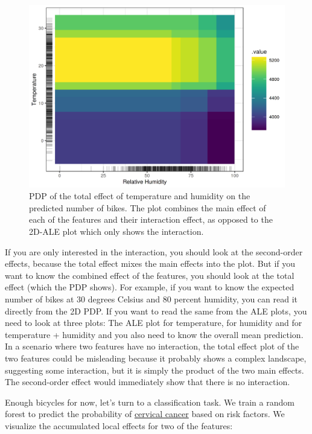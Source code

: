 \documentclass[12pt,]{krantz}
\begin{document}
\begin{figure}

{\centering \includegraphics[width=\textwidth]{images/pdp-bike-vs-ale-2D-1} 

}

\caption{PDP of the total effect of temperature and humidity on the predicted number of bikes. The plot combines the main effect of each of the features and their interaction effect, as opposed to the 2D-ALE plot which only shows the interaction.}\label{fig:pdp-bike-vs-ale-2D}
\end{figure}

If you are only interested in the interaction, you should look at the
second-order effects, because the total effect mixes the main effects
into the plot. But if you want to know the combined effect of the
features, you should look at the total effect (which the PDP shows). For
example, if you want to know the expected number of bikes at 30 degrees
Celsius and 80 percent humidity, you can read it directly from the 2D
PDP. If you want to read the same from the ALE plots, you need to look
at three plots: The ALE plot for temperature, for humidity and for
temperature + humidity and you also need to know the overall mean
prediction. In a scenario where two features have no interaction, the
total effect plot of the two features could be misleading because it
probably shows a complex landscape, suggesting some interaction, but it
is simply the product of the two main effects. The second-order effect
would immediately show that there is no interaction.

Enough bicycles for now, let's turn to a classification task. We train a
random forest to predict the probability of
\protect\hyperlink{cervical}{cervical cancer} based on risk factors. We
visualize the accumulated local effects for two of the features:
\end{document}

